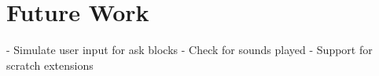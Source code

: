\chapter{Future Work}
- Simulate user input for ask blocks
- Check for sounds played
- Support for scratch extensions
